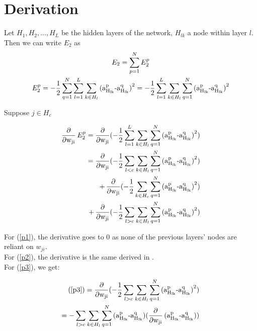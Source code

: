 \section{Derivation}
\label{sec:derivation}

Let $H_1, H_2,...,H_L$ be the hidden layers of the network, $H_{lk}$ a node within layer $l$. Then we can write $E_2$ as 
\begin{gather}
    E_2 = \sum_{p=1}^N E_2^p \\
    E_2^p = -\frac{1}{2}\sum_{q=1}^N\sum_{l=1}^L\sum_{k\in H_{l}} \operatorname{(a_{H_{lk}}^p - a_{H_{lk}}^q)}^2 = -\frac{1}{2}\sum_{l=1}^L\sum_{k\in H_{l}}\sum_{q=1}^N \operatorname{(a_{H_{lk}}^p - a_{H_{lk}}^q)}^2
\end{gather}

Suppose $j\in H_c$

\begin{align}
    \Deriv E_2^p = \Deriv (-\frac{1}{2}\sum_{l=1}^L\sum_{k\in H_{l}}\sum_{q=1}^N \Diff^2) \\
    = \Deriv (-\frac{1}{2}\sum_{l<c}\sum_{k\in H_{l}}\sum_{q=1}^N \Diff^2) \label{p1}\\
    + \Deriv (-\frac{1}{2}\sum_{k\in H_{c}}\sum_{q=1}^N \Diff^2) \label{p2}  \\
    + \Deriv (-\frac{1}{2}\sum_{l>c}\sum_{k\in H_{l}}\sum_{q=1}^N \Diff^2) \label{p3}
\end{align}

For (\ref{p1}), the derivative goes to 0 as none of the previous layers' nodes are reliant on $w_{ji}$. \\
For (\ref{p2}), the derivative is the same derived in \cite{thuan11}. \\
For (\ref{p3}), we get:

\begin{align}
    (\ref{p3}) = \Deriv (-\frac{1}{2}\sum_{l>c}\sum_{k\in H_{l}}\sum_{q=1}^N \Diff^2) \\
    = -\sum_{l>c}\sum_{k\in H_{l}}\sum_{q=1}^N \Diff (\Deriv\Diff) \label{deriv_gen}\\
\end{align}

